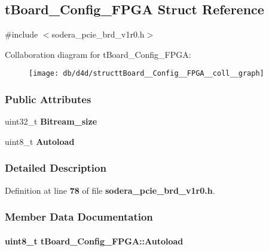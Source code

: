 \subsection{t\+Board\+\_\+\+Config\+\_\+\+F\+P\+GA Struct Reference}
\label{structtBoard__Config__FPGA}


{\ttfamily \#include $<$sodera\+\_\+pcie\+\_\+brd\+\_\+v1r0.\+h$>$}



Collaboration diagram for t\+Board\+\_\+\+Config\+\_\+\+F\+P\+GA\+:\nopagebreak
\begin{figure}[H]
\begin{center}
\leavevmode
\texttt{[image: db/d4d/structtBoard\_\_Config\_\_FPGA\_\_coll\_\_graph]}
\end{center}
\end{figure}
\subsubsection*{Public Attributes}
\begin{DoxyCompactItemize}
\item 
uint32\+\_\+t {\bf Bitream\+\_\+size}
\item 
uint8\+\_\+t {\bf Autoload}
\end{DoxyCompactItemize}


\subsubsection{Detailed Description}


Definition at line {\bf 78} of file {\bf sodera\+\_\+pcie\+\_\+brd\+\_\+v1r0.\+h}.



\subsubsection{Member Data Documentation}
\paragraph[{Autoload}]{\setlength{\rightskip}{0pt plus 5cm}uint8\+\_\+t t\+Board\+\_\+\+Config\+\_\+\+F\+P\+G\+A\+::\+Autoload}\label{structtBoard__Config__FPGA_a486b57b13b3e3017f8eba684fd3f34b1}


